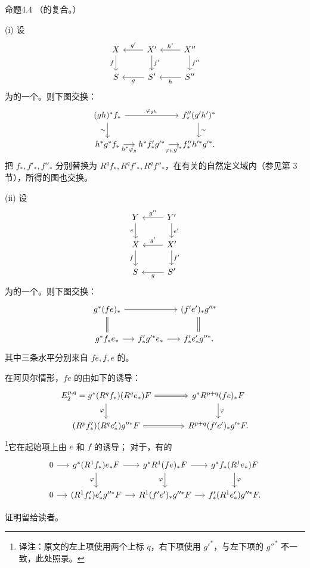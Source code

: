 \begin{SGAresult}{命题}{4.4}
（的复合。）

(i) 设
\[
\begin{tikzcd}
X\arrow[d,"f"']&X'\arrow[l,"g'"']\arrow[d,"f'"]&X''\arrow[l,"h'"']\arrow[d,"f''"]\\
S&S'\arrow[l,"g"]&S''\arrow[l,"h"]
\end{tikzcd}
\]
为的一个。则下图交换：
\[
\begin{tikzcd}[column sep=small]
(gh)^*f_*\arrow[rr,"\varphi_{gh}"]\arrow[d,"\sim"']&&f''_*(g'h')^*\arrow[d,"\sim"]\\
h^*g^*f_*\arrow[r,"h^*\varphi_g"']&h^*f'_*g'^*\arrow[r,"\varphi_hg'^*"']&f''_*h'^*g'^*.
\end{tikzcd}
\]
把 $f_*,f'_*,f''_*$ 分别替换为 $R^qf_*,R^qf'_*,R^qf''_*$，在有关的自然定义域内（参见第 3 节），所得的图也交换。

(ii) 设
\[
\begin{tikzcd}
Y\arrow[d,"e"']&Y'\arrow[l,"g''"']\arrow[d,"e'"]\\
X\arrow[d,"f"']&X'\arrow[l,"g'"']\arrow[d,"f'"]\\
S&S'\arrow[l,"g"]
\end{tikzcd}
\]
为的一个。则下图交换：
\[
\begin{tikzcd}[column sep=small]
g^*(fe)_*\arrow[rr]\arrow[d,equal]&&(f'e')_*g''^*\arrow[d,equal]\\
g^*f_*e_*\arrow[r]&f'_*g'^*e_*\arrow[r]&f'_*e'_*g''^*.
\end{tikzcd}
\]
其中三条水平分别来自 $fe,f,e$ 的。

在阿贝尔情形，$fe$ 的由如下的诱导：
\[
\begin{tikzcd}[column sep=large]
E_2^{p,q}=g^*(R^qf_*)(R^qe_*)F\arrow[r,Rightarrow]\arrow[d,"\varphi"']&g^*R^{p+q}(fe)_*F\arrow[d,"\varphi"]\\
(R^pf'_*)(R^qe'_*)g''^*F\arrow[r,Rightarrow]&R^{p+q}(f'e')_*g'^*F.
\end{tikzcd}
\]
\footnote{译注：原文的左上项使用两个上标 $q$，右下项使用 $g'^*$，与左下项的 $g''^*$ 不一致，此处照录。}它在起始项上由 $e$ 和 $f$ 的诱导；
对于，有的
\[
\begin{tikzcd}[column sep=small]
0\arrow[r]&g^*(R^1f_*)e_*F\arrow[r]\arrow[d,"\varphi"']&g^*R^1(fe)_*F\arrow[r]\arrow[d,"\varphi"']&g^*f_*(R^1e_*)F\arrow[d,"\varphi"]\\
0\arrow[r]&(R^1f'_*)e'_*g''^*F\arrow[r]&R^1(f'e')_*g''^*F\arrow[r]&f'_*(R^1e'_*)g''^*F.
\end{tikzcd}
\]
\end{SGAresult}
证明留给读者。

